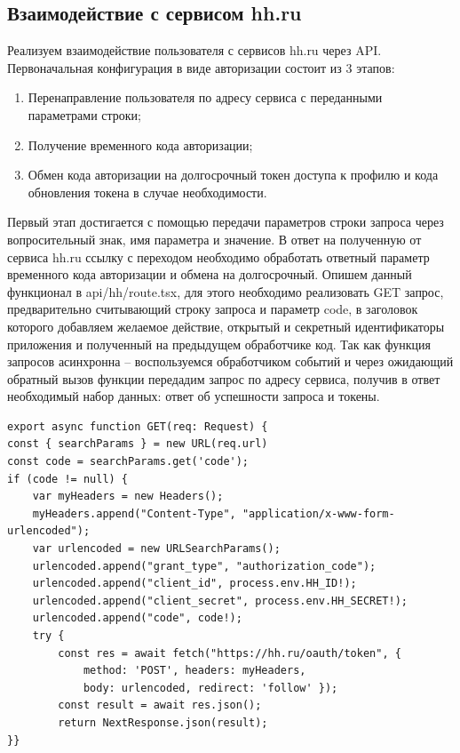 \documentclass[master, och, pract]{SCWorks}
\begin{document}
\subsection{Взаимодействие с сервисом hh.ru}
Реализуем взаимодействие пользователя с сервисов hh.ru через API. Первоначальная конфигурация в виде авторизации состоит из 3 этапов:
\begin{enumerate}
    \item Перенаправление пользователя по адресу сервиса с переданными параметрами строки;
    \item Получение временного кода авторизации;
    \item Обмен кода авторизации на долгосрочный токен доступа к профилю и кода обновления токена в случае необходимости. 
\end{enumerate}

Первый этап достигается с помощью передачи параметров строки запроса через вопросительный знак, имя параметра и значение. В ответ на полученную от сервиса hh.ru ссылку с переходом необходимо обработать ответный параметр временного кода авторизации и обмена на долгосрочный. Опишем данный функционал в api/hh/route.tsx, для этого необходимо реализовать GET запрос, предварительно считывающий строку запроса и параметр code, в заголовок которого добавляем желаемое действие, открытый и секретный идентификаторы приложения и полученный на предыдущем обработчике код. Так как функция запросов асинхронна – воспользуемся обработчиком событий и через ожидающий обратный вызов функции передадим запрос по адресу сервиса, получив в ответ необходимый набор данных: ответ об успешности запроса и токены.
\begin{verbatim}
export async function GET(req: Request) {
const { searchParams } = new URL(req.url)
const code = searchParams.get('code');
if (code != null) {
    var myHeaders = new Headers();
    myHeaders.append("Content-Type", "application/x-www-form-urlencoded");
    var urlencoded = new URLSearchParams();
    urlencoded.append("grant_type", "authorization_code");
    urlencoded.append("client_id", process.env.HH_ID!);
    urlencoded.append("client_secret", process.env.HH_SECRET!);
    urlencoded.append("code", code!);
    try {
        const res = await fetch("https://hh.ru/oauth/token", {
            method: 'POST', headers: myHeaders,
            body: urlencoded, redirect: 'follow' });   
        const result = await res.json();
        return NextResponse.json(result);
}} 
\end{verbatim}
\end{document}
